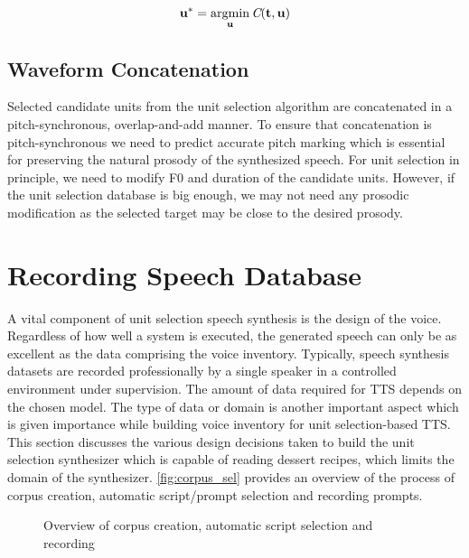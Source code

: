 \documentclass[lettersize,journal]{IEEEtran}
\begin{document}
\begin{equation}
    \bf{u^*} = \operatorname*{argmin}_u \textit{C}(\bf{t}, \bf{u})
\end{equation}


\subsection{Waveform Concatenation}


Selected candidate units from the unit selection algorithm are concatenated in a pitch-synchronous, overlap-and-add manner.  To ensure that concatenation is pitch-synchronous we need to predict accurate pitch marking which is essential for preserving the natural prosody of the synthesized speech. For unit selection in principle, we need to modify F0  and duration of the candidate units. However, if  the unit selection database is big enough, we may not need any prosodic modification as the selected target may be close to the desired prosody.

\section{Recording Speech Database}
\label{section:recording_sd}

A vital component of unit selection speech synthesis is the design of the voice. Regardless of how well a system is executed, the generated speech can only be as excellent as the data comprising the voice inventory. Typically, speech synthesis datasets are recorded professionally by a single speaker in a controlled environment under supervision. The amount of data required for TTS depends on the chosen model. The type of data or domain is another important aspect which is given importance while building voice inventory for unit selection-based TTS. This section discusses the various design decisions taken to build the unit selection synthesizer which is capable of reading dessert recipes, which limits the domain of the synthesizer. \autoref{fig:corpus_sel} provides an overview of the process of corpus creation, automatic script/prompt selection and recording prompts.

\begin{figure}[!htbp]
    \centering 
    \caption{Overview of corpus creation, automatic script selection and recording}
    \label{fig:corpus_sel}
\end{figure}
\end{document}
